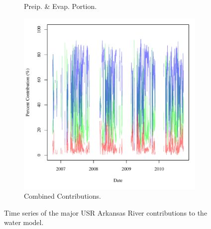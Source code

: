 \begin{figure}[htbp]
\begin{subfigure}{0.5\textwidth}
		\caption{Preip. \& Evap. Portion.}
	\end{subfigure}%
	\begin{subfigure}{0.5\textwidth}
		\centering
		\includegraphics[width=\tableCustomSize]{"Figures/Results_USR/Stochastic/M Water Contrib 4"}
		\caption{Combined Contributions.}
	\end{subfigure}
	\caption[Time series of the major USR Arkansas River contributions to the water model.]{Time series of the major USR Arkansas River contributions to the water model.}
	\label{fig:USRWaterContrib}
\end{figure}

